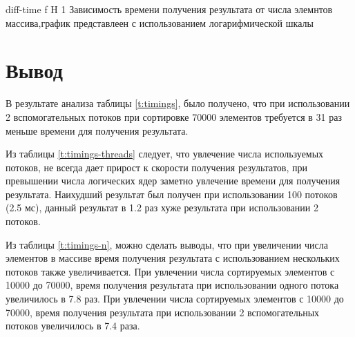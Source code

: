 {diff-time} %
{f} %
{H} %
{1\textwidth} %
{Зависимость времени получения результата от числа элемнтов массива,график представлеен с использованием логарифмической шкалы} %


\section*{Вывод}
В результате анализа таблицы \ref{t:timings}, было получено, что при использовании 2 вспомогательных потоков при сортировке 70000 элементов требуется в 31 раз меньше времени для получения результата. 

Из таблицы  \ref{t:timings-threads}  следует, что увлечение числа используемых потоков, не всегда дает прирост к скорости получения результатов, при превышении числа логических ядер заметно увлечение времени для получения результата. Наихудший результат был получен при использовании 100 потоков (2.5 мс), данный результат в 1.2 раз хуже результата при использовании 2 потоков.

Из таблицы \ref{t:timings-n}, можно сделать выводы, что при увеличении числа элементов в массиве
время получения результата с использованием нескольких потоков также увеличивается. При увлечении числа сортируемых элементов с 10000 до 70000, время получения результата при использовании одного потока  увеличилось в 7.8 раз.
При увлечении числа сортируемых элементов с 10000 до 70000, время получения результата при использовании 2 вспомогательных потоков увеличилось в 7.4 раза.


